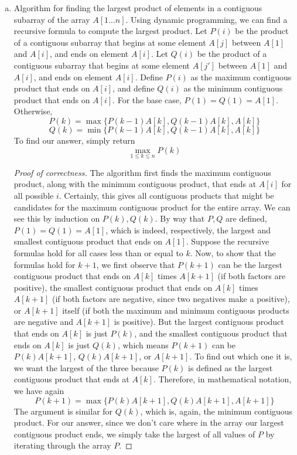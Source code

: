 \documentclass{article}
\begin{document}
\begin{enumerate}[(a)]
\item Algorithm for finding the largest product of elements in a contiguous subarray of the array $A[1 \dots n]$. Using dynamic programming, we can find a recursive formula to compute the largest product. Let $P(i)$ be the product of a contiguous subarray that begins at some element $A[j]$ between $A[1]$ and $A[i]$, and ends on element $A[i]$. Let $Q(i)$ be the product of a contiguous subarray that begins at some element $A[j']$ between $A[1]$ and $A[i]$, and ends on element $A[i]$. Define $P(i)$ as the maximum contiguous product that ends on $A[i]$, and define $Q(i)$ as the minimum contiguous product that ends on $A[i]$. For the base case, $P(1)=Q(1)=A[1]$. Otherwise,
$$P(k) = \max\{P(k-1)A[k], Q(k-1)A[k], A[k]   \}$$
$$Q(k) = \min\{P(k-1)A[k], Q(k-1)A[k], A[k]   \}$$
To find our answer, simply return
$$\max_{1\leq k \leq n} P(k)$$


\begin{proof}[Proof of correctness]
The algorithm first finds the maximum contiguous product, along with the minimum contiguous product, that ends at $A[i]$ for all possible $i$.  Certainly, this gives all contiguous products that might be candidates for the maximum contiguous product for the entire array. We can see this by induction on $P(k),Q(k)$. By way that $P,Q$ are defined, $P(1)=Q(1)=A[1]$, which is indeed, respectively, the largest and smallest contiguous product that ends on $A[1]$. Suppose the recursive formulas hold for all cases less than or equal to $k$. Now, to show that the formulas hold for $k+1$, we first observe that $P(k+1)$ can be the largest contiguous product that ends on $A[k]$ times $A[k+1]$ (if both factors are positive), the smallest contiguous product that ends on $A[k]$ times $A[k+1]$ (if both factors are negative, since two negatives make a positive), or $A[k+1]$ itself (if both the maximum and minimum contiguous products are negative and $A[k+1]$ is positive). But the largest contiguous product that ends on $A[k]$ is just $P(k)$, and the smallest contiguous product that ends on $A[k]$ is just $Q(k)$, which means $P(k+1)$ can be $P(k)A[k+1]$, $Q(k)A[k+1]$, or $A[k+1]$. To find out which one it is, we want the largest of the three because $P(k)$ is defined as the largest contiguous product that ends at $A[k]$. Therefore, in mathematical notation, we have again
$$P(k+1) = \max\{P(k)A[k+1],Q(k)A[k+1], A[k+1]\}$$
The argument is similar for $Q(k)$, which is, again, the minimum contiguous product.
For our answer, since we don't care where in the array our largest contiguous product ends, we simply take the largest of all values of $P$ by iterating through the array $P$.
\end{proof}


\end{enumerate}
\end{document}
